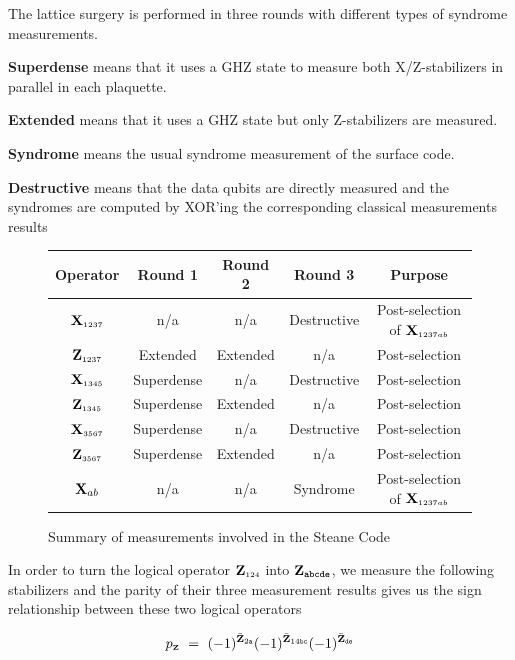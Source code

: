 \documentclass{article}
\newcommand{\sub}[1]{_{\scriptscriptstyle #1}}
\newcommand{\Op}[1]{{\bf #1}}
\begin{document}
	The lattice surgery is performed in three rounds with different types of syndrome measurements.

	\textbf{Superdense} means that it uses a GHZ state to measure both X/Z-stabilizers in parallel in each plaquette.
	
	\textbf{Extended} means that it uses a GHZ state but only Z-stabilizers are measured.
	
	\textbf{Syndrome} means the usual syndrome measurement of the surface code.
	
	\textbf{Destructive} means that the data qubits are directly measured and the syndromes are computed by XOR'ing the corresponding classical measurements results

	\begin{figure}[h!]
		\centering
		\begin{tabular}{|c|c|c|c|c|}
			\hline
			Operator & Round 1 & Round 2 & Round 3 & Purpose \\\hline\hline
			$\Op{X}\sub{1237}$ & n/a & n/a & Destructive & Post-selection of $\Op{X}\sub{1237ab}$ \\
			$\Op{Z}\sub{1237}$ & Extended & Extended & n/a & Post-selection \\
			$\Op{X}\sub{1345}$ & Superdense & n/a & Destructive & Post-selection \\
			$\Op{Z}\sub{1345}$ & Superdense & Extended & n/a & Post-selection \\
			$\Op{X}\sub{3567}$ & Superdense & n/a & Destructive & Post-selection \\
			$\Op{Z}\sub{3567}$ & Superdense & Extended & n/a & Post-selection \\
			$\Op{X}_{ab}$ & n/a & n/a & Syndrome & Post-selection of $\Op{X}\sub{1237ab}$ \\
			\hline
		\end{tabular}
		\caption{Summary of measurements involved in the Steane Code}
	\end{figure}

	In order to turn the logical operator $\Op{Z}\sub{124}$ into $\Op{Z}_{\mbox{\scriptsize\tt abcde}}$, we measure the following stabilizers and the parity of their three measurement results gives us the sign relationship between these two logical operators

	\begin{equation*}
		p\sub{\Op{Z}} ~=~ (-1)^{\bar{\Op{Z}}_{2\tt a}}(-1)^{\bar{\Op{Z}}_{14\tt bc}}(-1)^{\bar{\Op{Z}}_{\tt de}}
	\end{equation*}
\end{document}
